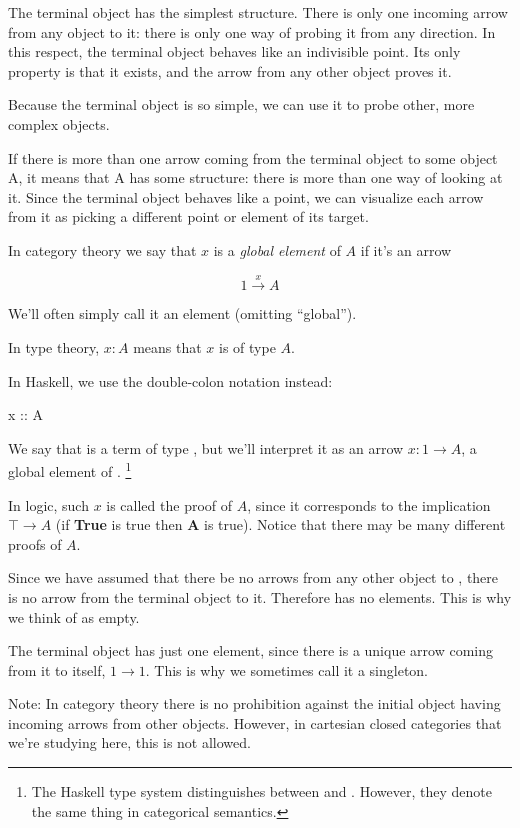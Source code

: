 \documentclass[DaoFP]{subfiles}
\begin{document}
The terminal object has the simplest structure. There is only one incoming arrow from any object to it: there is only one way of probing it from any direction. In this respect, the terminal object behaves like an indivisible point. Its only property is that it exists, and the arrow from any other object proves it. 

Because the terminal object is so simple, we can use it to probe other, more complex objects. 

If there is more than one arrow coming from the terminal object to some object A, it means that A has some structure: there is more than one way of looking at it. Since the terminal object behaves like a point, we can visualize each arrow from it as picking a different point or element of its target. 

In category theory we say that $ x$ is a \emph{global element} of $ A$ if it's an arrow

\[ 1 \xrightarrow x A \]

We'll often simply call it an element (omitting ``global'').

In type theory, $ x \colon A$ means that $ x$ is of type $ A$.

In Haskell, we use the double-colon notation instead:

\begin{haskell}
x :: A
\end{haskell}
We say that  is a term of type , but we'll interpret it as an arrow $x : 1 \to A$, a global element of . \footnote{The Haskell type system distinguishes between  and . However, they denote the same thing in categorical semantics.}

In logic, such $ x$ is called the proof of $ A$, since it corresponds to the implication $ \top \to A$ (if \textbf{True} is true then \textbf{A} is true). Notice that there may be many different proofs of $A$.

Since we have assumed that there be no arrows from any other object to , there is no arrow from the terminal object to it. Therefore  has no elements. This is why we think of  as empty.

The terminal object has just one element, since there is a unique arrow coming from it to itself, $ 1 \to 1$. This is why we sometimes call it a singleton. 

Note: In category theory there is no prohibition against the initial object having incoming arrows from other objects. However, in cartesian closed categories that we're studying here, this is not allowed.
\end{document}
